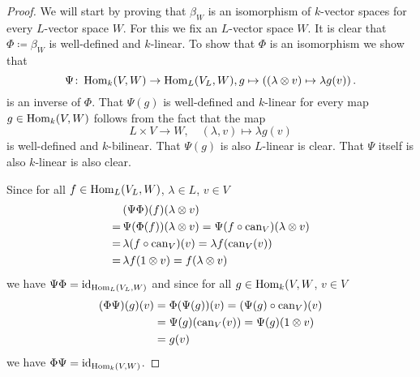 \begin{proof}
  We will start by proving that $\beta_W$ is an isomorphism of $k$-vector spaces for every $L$-vector space $W$.
  For this we fix an $L$-vector space $W$.
  It is clear that $\Phi \coloneqq \beta_W$ is well-defined and $k$-linear.
  To show that $\Phi$ is an isomorphism we show that
  \[
            \Psi
    \colon  \operatorname{Hom}_k(V,W)
    \to     \operatorname{Hom}_L(V_L, W),
            g
    \mapsto \left(
                      (\lambda \otimes v)
              \mapsto \lambda g(v)
            \right).
  \]
  is an inverse of $\Phi$.
  That $\Psi(g)$ is well-defined and $k$-linear for every map \mbox{$g \in \operatorname{Hom}_k(V,W)$} follows from the fact that the map
  \[
            L \times V
    \to     W,
    \quad   (\lambda, v)
    \mapsto \lambda g(v)
  \]
  is well-defined and $k$-bilinear.
  That $\Psi(g)$ is also $L$-linear is clear.
  That $\Psi$ itself is also $k$-linear is also clear.
  
  Since for all $f \in \operatorname{Hom}_L(V_L,W)$, $\lambda \in L$, $v \in V$
  \begin{align*}
     &\,  (\Psi \Phi)(f)(\lambda \otimes v) \\
    =&\,  \Psi(\Phi(f))(\lambda \otimes v)
    =     \Psi(f \circ \operatorname{can}_V)(\lambda \otimes v) \\
    =&\,  \lambda (f \circ \operatorname{can}_V)(v)
    =     \lambda f(\operatorname{can}_V(v)) \\
    =&\,  \lambda f(1 \otimes v)
    =     f (\lambda \otimes v)
  \end{align*}
  we have $\Psi \Phi = \operatorname{id}_{\operatorname{Hom}_L(V_L, W)}$ and since for all $g \in \operatorname{Hom}_k(V,W$, $v \in V$
  \begin{align*}
        (\Phi \Psi)(g)(v)
    &=  \Phi(\Psi(g))(v)
     =  (\Psi(g) \circ \operatorname{can}_V)(v) \\
    &=  \Psi(g)(\operatorname{can}_V(v))
     =  \Psi(g)(1 \otimes v) \\
    &=  g(v)
  \end{align*}
  we have $\Phi \Psi = \operatorname{id}_{\operatorname{Hom}_k(V,W)}$.
  

\end{proof}
